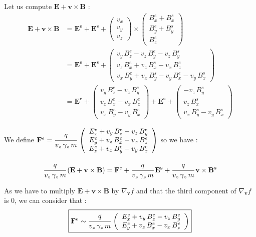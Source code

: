 \documentclass[10pt]{article}
\begin{document}
Let us compute $\mathbf{E}+\mathbf{v}\times\mathbf{B}$ :
\begin{align*}
\mathbf{E}+\mathbf{v}\times\mathbf{B} &= \mathbf{E^e} + \mathbf{E^s} +
\left( \begin{array}{c}
v_x \\
v_y \\
v_z
\end{array} \right) \times
\left( \begin{array}{c}
B_x^e + B_x^s \\
B_y^e + B_y^s \\
B_z^e
\end{array} \right) \\
&= \mathbf{E^e} + \mathbf{E^s} +
\left( \begin{array}{c}
v_y\,B_z^e - v_z\,B_y^e - v_z\,B_y^s \\
v_z\,B_x^e + v_z\,B_x^s - v_x\,B_z^e \\
v_x\,B_y^e + v_x\,B_y^s - v_y\,B_x^e - v_y\,B_x^s
\end{array} \right) \\
&= \mathbf{E^e} +
\left( \begin{array}{c}
v_y\,B_z^e - v_z\,B_y^e \\
v_z\,B_x^e - v_x\,B_z^e \\
v_x\,B_y^e - v_y\,B_x^e
\end{array} \right)
+ \mathbf{E^s} + 
\left( \begin{array}{c}
- v_z\,B_y^s \\
v_z\,B_x^s \\
v_x\,B_y^s - v_y\,B_x^s
\end{array} \right) 
\end{align*}

We define 
$\mathbf{F}^{e} = \cfrac{q}{v_{z}\,\gamma_{z}\,m}\, \left(
\begin{array}{c}
E_{x}^{e} + v_{y}\,B_{z}^{e} - v_{z}\,B_{y}^{e} \\
E_{y}^{e} + v_{z}\,B_{x}^{e} - v_{x}\,B_{z}^{e} \\
E_{z}^{e} + v_{x}\,B_{y}^{e} - v_{y}\,B_{x}^{e}
\end{array}
\right)$ so we have :

$$
\cfrac{q}{v_{z}\,\gamma_{z}\,m}\,(\mathbf{E}+\mathbf{v}\times\mathbf{B}) = \mathbf{F}^{e} + \cfrac{q}{v_{z}\,\gamma_{z}\,m}\,\mathbf{E^s} + \cfrac{q}{v_{z}\,\gamma_{z}\,m}\,\mathbf{v} \times \mathbf{B^s}
$$

As we have to multiply $\mathbf{E}+\mathbf{v}\times\mathbf{B}$ by $\nabla_{\mathbf{v}}f$ and that the third component of $\nabla_{\mathbf{v}}f$ is 0, we can consider that :
$$\boxed{\mathbf{F}^{e} \sim \cfrac{q}{v_{z}\,\gamma_{z}\,m}\, \left(
\begin{array}{c}
E_{x}^{e} + v_{y}\,B_{z}^{e} - v_{z}\,B_{y}^{e} \\
E_{y}^{e} + v_{z}\,B_{x}^{e} - v_{x}\,B_{z}^{e}
\end{array}
\right)}$$
\end{document}
